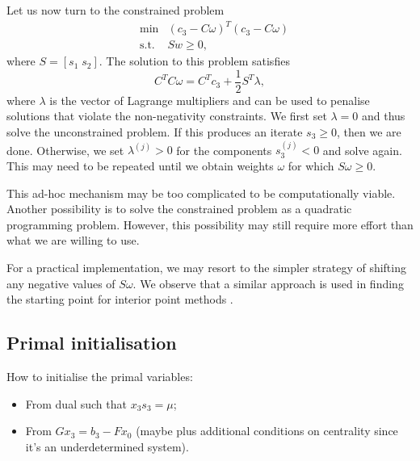 Let us now turn to the constrained problem
\begin{eqnarray*}
  &\min &(c_3 - C\omega)^T(c_3 - C\omega) \\
  &\mbox{s.t.} &Sw \ge 0,
\end{eqnarray*}
where $S = [s_1 \; s_2]$. The solution to this problem satisfies
\[
  C^T C\omega = C^T c_3 + \frac{1}{2}S^T\lambda,
\]
where $\lambda$ is the vector of Lagrange multipliers and can be 
used to penalise solutions that violate the non-negativity 
constraints. We first set $\lambda = 0$ and thus solve the 
unconstrained problem. If this produces an iterate $s_3 \ge 0$, 
then we are done. Otherwise, we set $\lambda^{(j)} > 0$ for the 
components $s_3^{(j)} <0$ and solve again. This may need to be 
repeated until we obtain weights $\omega$ for which $S\omega \ge 0$.

This ad-hoc mechanism may be too complicated to be 
computationally viable. Another possibility is to solve the 
constrained problem as a quadratic programming problem. However, 
this possibility may still require more effort than what 
we are willing to use.

For a practical implementation, we may resort to the simpler 
strategy of shifting any negative values of $S\omega$. 
We observe that a similar approach is used in finding the starting 
point for interior point methods \cite{Mehrotra92}.

%
%
\subsection{Primal initialisation}

How to initialise the primal variables:
\begin{itemize}
\item From dual such that $x_3s_3 = \mu$;
\item From $Gx_3 = b_3 - Fx_0$ (maybe plus additional conditions 
on centrality since it's an underdetermined system).
\end{itemize}
